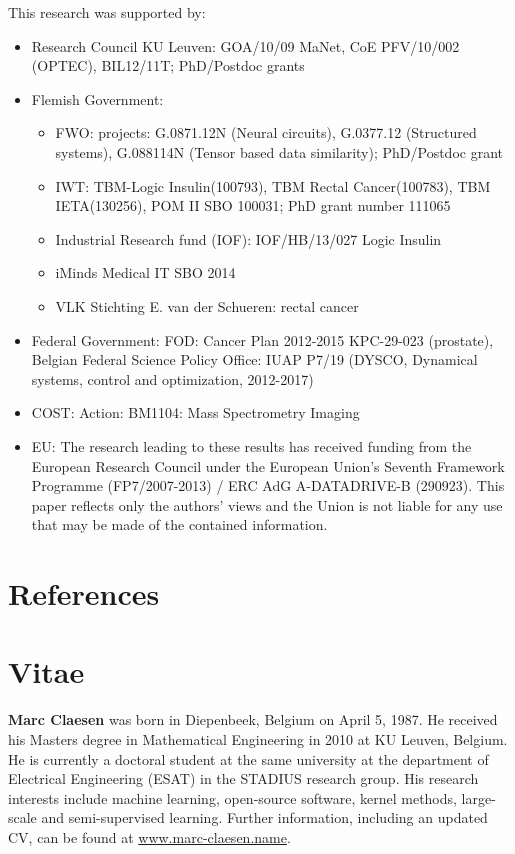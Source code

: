 \documentclass[preprint,elsarticle-num,12pt]{elsarticle}
\begin{document}
This research was supported by: 
\begin{itemize}
\item Research Council KU Leuven: GOA/10/09 MaNet, CoE PFV/10/002 (OPTEC), BIL12/11T; PhD/Postdoc grants
\item Flemish Government:
\begin{itemize}
\item FWO: projects:  G.0871.12N (Neural circuits), G.0377.12 (Structured systems), G.088114N (Tensor based data similarity); PhD/Postdoc grant
\item IWT: TBM-Logic Insulin(100793), TBM Rectal Cancer(100783), TBM IETA(130256), POM II  SBO 100031; PhD grant number 111065
\item Industrial Research fund (IOF): IOF/HB/13/027 Logic Insulin
\item iMinds Medical IT SBO 2014
\item VLK Stichting E. van der Schueren: rectal cancer
\end{itemize}
\item Federal Government: FOD: Cancer Plan 2012-2015 KPC-29-023 (prostate), Belgian Federal Science Policy Office: IUAP P7/19 (DYSCO, Dynamical systems, control and optimization, 2012-2017)
\item COST: Action: BM1104: Mass Spectrometry Imaging
\item EU: The research leading to these results has received funding from the European Research Council under the European Union's Seventh Framework Programme (FP7/2007-2013) / ERC AdG A-DATADRIVE-B (290923).  This paper reflects only the authors' views and the Union is not liable for any use that may be made of the contained information.
\end{itemize}

\section*{References}

%




\section{Vitae}
{\noindent}\textbf{Marc Claesen} was born in Diepenbeek, Belgium on April 5, 1987. He received his Masters degree in Mathematical Engineering in 2010 at KU Leuven, Belgium. He is currently a doctoral student at the same university at the department of Electrical Engineering (ESAT) in the STADIUS research group. His research interests include machine learning, open-source software, kernel methods, large-scale and semi-supervised learning. Further information, including an updated CV, can be found at \url{www.marc-claesen.name}. \\
\end{document}
